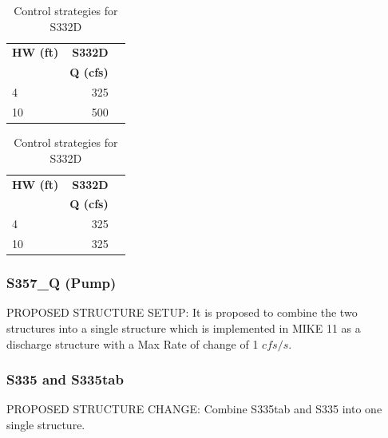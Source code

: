 \footnotesize
\begin{table}[!h]
\centering
\caption{Control strategies for S332D}
\label{tab:CS-S332DB}
\begin{tabular}{l|rr}
\hline
\textbf{HW (ft)} &  \textbf{S332D} \\
\textbf{       } & \textbf{Q (cfs)} \\
\hline
4	     &    325  \\
10	     &    500  \\
\hline
\end{tabular}
\end{table}
\normalsize

\footnotesize
\begin{table}[!h]
\centering
\caption{Control strategies for S332D}
\label{tab:CS-S332DC}
\begin{tabular}{l|rr}
\hline
\textbf{HW (ft)} &  \textbf{S332D} \\
\textbf{       } & \textbf{Q (cfs)} \\
\hline
4	     &    325  \\
10	     &    325  \\
\hline
\end{tabular}
\end{table}
\normalsize

\subsubsection{S357\_Q (Pump)}

PROPOSED STRUCTURE SETUP: It is proposed to combine the two structures into a single structure which is implemented in MIKE 11 as a discharge structure with a Max Rate of change of 1 $cfs/s$.

\subsubsection{S335 and S335tab}

PROPOSED STRUCTURE CHANGE: Combine S335tab and S335 into one single structure.

\cleardoublepage
